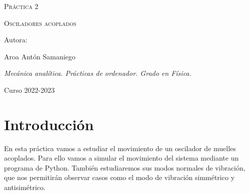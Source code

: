 \documentclass{article}
\begin{document}


\BgThispage 
\begin{titlepage}
	\thispagestyle{empty} %
	\begin{tikzpicture}[overlay,fill opacity=0.7]	
	\end{tikzpicture}

{\itshape\Large \par}
\vspace{1.75cm}
\centering
{\scshape\Huge Práctica 2\par}
{\scshape\Huge Osciladores acoplados \par}
\vspace{3cm}
\centering
\vfill
\vspace{10cm}
{\Large Autora: \par}
{\Large Aroa Antón Samaniego \par}
\vfill
{\itshape\Large Mecánica analítica. Prácticas de ordenador. Grado en Física. \par}
{\centering\Large Curso 2022-2023 \par}
\end{titlepage}
    \tableofcontents\hspace{5cm}\pagebreak
\section{Introducción}
En esta práctica vamos a estudiar el movimiento de un oscilador de muelles acoplados. Para ello vamos a simular el movimiento del sistema mediante un programa de Python. También estudiaremos sus modos normales de vibración, que nos permitirán observar casos como el modo de vibración simmétrico y antisimétrico. 
\end{document}
